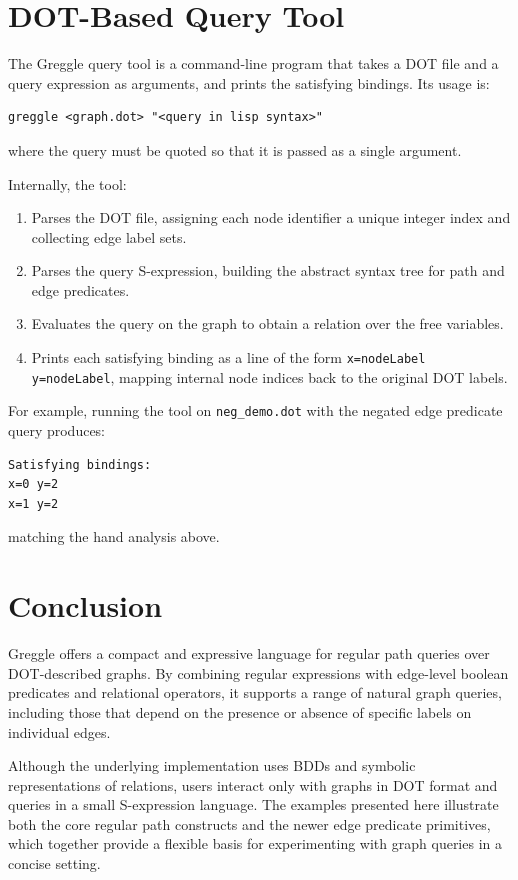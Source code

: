\documentclass[11pt]{article}
\begin{document}
\section{DOT-Based Query Tool}

The Greggle query tool is a command-line program that takes a DOT file
and a query expression as arguments, and prints the satisfying
bindings.  Its usage is:
\begin{verbatim}
greggle <graph.dot> "<query in lisp syntax>"
\end{verbatim}
where the query must be quoted so that it is passed as a single
argument.

Internally, the tool:
\begin{enumerate}[leftmargin=*]
  \item Parses the DOT file, assigning each node identifier a unique
        integer index and collecting edge label sets.
  \item Parses the query S-expression, building the abstract syntax
        tree for path and edge predicates.
  \item Evaluates the query on the graph to obtain a relation over the
        free variables.
  \item Prints each satisfying binding as a line of the form
        \texttt{x=nodeLabel y=nodeLabel}, mapping internal node
        indices back to the original DOT labels.
\end{enumerate}

For example, running the tool on \texttt{neg\_demo.dot} with the
negated edge predicate query produces:
\begin{verbatim}
Satisfying bindings:
x=0 y=2
x=1 y=2
\end{verbatim}
matching the hand analysis above.

\section{Conclusion}

Greggle offers a compact and expressive language for regular path
queries over DOT-described graphs.  By combining regular expressions
with edge-level boolean predicates and relational operators, it
supports a range of natural graph queries, including those that depend
on the presence or absence of specific labels on individual edges.

Although the underlying implementation uses BDDs and symbolic
representations of relations, users interact only with graphs in DOT
format and queries in a small S-expression language.  The examples
presented here illustrate both the core regular path constructs and
the newer edge predicate primitives, which together provide a flexible
basis for experimenting with graph queries in a concise setting.
\end{document}
